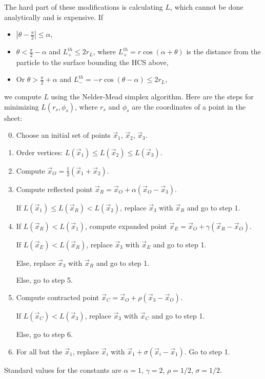 \documentclass[11pt]{article}
\begin{document}
The hard part of these modifications is calculating $L$, which cannot be done analytically and is expensive.  If
\begin{itemize}
    \item
        $|\theta - \frac{\pi}{2}| \leq \alpha$,
    \item
        $\theta < \frac{\pi}{2} - \alpha$ and $L_+^{th} \leq 2 r_L$, where $L_+^{th} = r \cos(\alpha + \theta)$ is the distance from the particle to the surface bounding the HCS above,
    \item
        Or $\theta > \frac{\pi}{2} + \alpha$ and $L_-^{th} = - r \cos(\theta - \alpha) \leq 2 r_L$,
\end{itemize}
we compute $L$ using the Nelder-Mead simplex algorithm.  Here are the steps for minimizing $L(r_s, \phi_s)$, where $r_s$ and $\phi_s$ are the coordinates of a point in the sheet:
\begin{enumerate}
    \setcounter{enumi}{-1}
    \item
        Choose an initial set of points $\vec{x}_1$, $\vec{x}_2$, $\vec{x}_3$.
    \item
        Order vertices: $L(\vec{x}_1) \leq L(\vec{x}_2) \leq L(\vec{x}_3)$.
    \item
        Compute $\vec{x}_O = \frac{1}{2} (\vec{x}_1 + \vec{x}_2)$.
    \item
        Compute reflected point $\vec{x}_R = \vec{x}_O + \alpha (\vec{x}_O - \vec{x}_3)$.
        
        If $L(\vec{x}_1) \leq L(\vec{x}_R) < L(\vec{x}_2)$, replace $\vec{x}_3$ with $\vec{x}_R$ and go to step 1.
    \item
        If $L(\vec{x}_R) < L(\vec{x}_1)$, compute expanded point $\vec{x}_E = \vec{x}_O + \gamma (\vec{x}_R - \vec{x}_O)$.  

        \quad If $L(\vec{x}_E) < L(\vec{x}_R)$, replace $\vec{x}_3$ with $\vec{x}_E$ and go to step 1.

        \quad Else, replace $\vec{x}_3$ with $\vec{x}_R$ and go to step 1.

        Else, go to step 5.
    \item
        Compute contracted point $\vec{x}_C = \vec{x}_O + \rho (\vec{x}_3 - \vec{x}_O)$.

        If $L(\vec{x}_C) < L(\vec{x}_3)$, replace $\vec{x}_3$ with $\vec{x}_C$ and go to step 1.

        Else, go to step 6.
    \item
        For all but the $\vec{x}_1$, replace $\vec{x}_i$ with $\vec{x}_1 + \sigma (\vec{x}_i - \vec{x}_1)$.  Go to step 1.
\end{enumerate}
Standard values for the constants are $\alpha = 1$, $\gamma = 2$, $\rho = 1/2$, $\sigma = 1/2$.  
\end{document}
